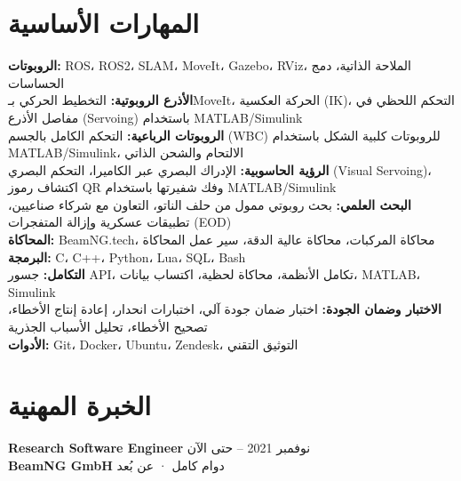 \documentclass[11pt,a4paper]{article}
\newcommand{\en}[1]{\textenglish{#1}}
\begin{document}
\section*{المهارات الأساسية}

{\small
\textbf{\color{PrimaryColor}الروبوتات:} \en{ROS}، \en{ROS2}، \en{SLAM}، \en{MoveIt}، \en{Gazebo}، \en{RViz}، الملاحة الذاتية، دمج الحساسات\\
\textbf{\color{PrimaryColor}الأذرع الروبوتية:} التخطيط الحركي بـ\en{MoveIt}، الحركة العكسية (\en{IK})، التحكم اللحظي في مفاصل الأذرع (\en{Servoing}) باستخدام \en{MATLAB/Simulink}\\
\textbf{\color{PrimaryColor}الروبوتات الرباعية:} التحكم الكامل بالجسم (\en{WBC}) للروبوتات كلبية الشكل باستخدام \en{MATLAB/Simulink}، الالتحام والشحن الذاتي\\
\textbf{\color{PrimaryColor}الرؤية الحاسوبية:} الإدراك البصري عبر الكاميرا، التحكم البصري (\en{Visual Servoing})، اكتشاف رموز \en{QR} وفك شفيرتها باستخدام \en{MATLAB/Simulink}\\
\textbf{\color{PrimaryColor}البحث العلمي:} بحث روبوتي ممول من حلف الناتو، التعاون مع شركاء صناعيين، تطبيقات عسكرية وإزالة المتفجرات (\en{EOD})\\
\textbf{\color{PrimaryColor}المحاكاة:} \en{BeamNG.tech}، محاكاة المركبات، محاكاة عالية الدقة، سير عمل المحاكاة\\
\textbf{\color{PrimaryColor}البرمجة:} \en{C}، \en{C++}، \en{Python}، \en{Lua}، \en{SQL}، \en{Bash}\\
\textbf{\color{PrimaryColor}التكامل:} جسور \en{API}، تكامل الأنظمة، محاكاة لحظية، اكتساب بيانات، \en{MATLAB}، \en{Simulink}\\
\textbf{\color{PrimaryColor}الاختبار وضمان الجودة:} اختبار ضمان جودة آلي، اختبارات انحدار، إعادة إنتاج الأخطاء، تصحيح الأخطاء، تحليل الأسباب الجذرية\\
\textbf{\color{PrimaryColor}الأدوات:} \en{Git}، \en{Docker}، \en{Ubuntu}، \en{Zendesk}، التوثيق التقني
}

\section*{الخبرة المهنية}

\textbf{\color{PrimaryColor}\en{Research Software Engineer}} \hfill نوفمبر 2021 -- حتى الآن\\
\textbf{\en{BeamNG GmbH}} \hfill دوام كامل · عن بُعد
\end{document}
